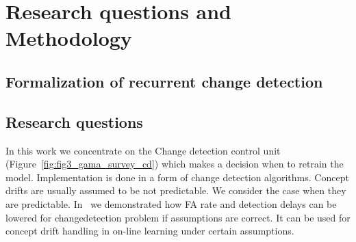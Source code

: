 \chapter{Research questions and Methodology}

\section{Formalization of recurrent change detection}



\section{Research questions}
In this work we concentrate on the Change detection control unit (Figure~\ref{fig:fig3_gama_survey_cd}) which makes a decision when to retrain the model.
Implementation is done in a form of change detection algorithms.
Concept drifts are usually assumed to be not predictable.
We consider the case when they are predictable.
In~\cite{XXX} we demonstrated how FA rate and detection delays can be lowered for changedetection problem if assumptions are correct.
It can be used for concept drift handling in on-line learning under certain assumptions.

